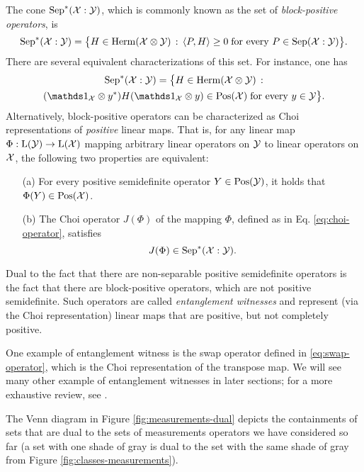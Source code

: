 The cone $\mathrm{Sep}^{\ast}(\mathcal{X} : \mathcal{Y})$, which is commonly known as the set of 
\emph{block-positive operators}, is
\begin{equation}
  \mathrm{Sep}^{\ast}(\mathcal{X}:\mathcal{Y}) = \bigl\{
  H\in\mathrm{Herm}(\mathcal{X}\otimes\mathcal{Y})\,:\,
  \langle P , H\rangle \geq 0 \;\text{for every $P \in \mathrm{Sep}(\mathcal{X}:\mathcal{Y})$}\bigr\}.
\end{equation}
There are several equivalent characterizations of this set.
For instance, one has
\begin{multline}
  \BPos(\X:\Y) = \bigl\{
  H\in\Herm(\X\otimes\Y)\,:\\
  (\I_{\X} \otimes y^{\ast}) H (\I_{\X} \otimes y)\in\Pos(\X)
  \;\text{for every $y\in\Y$}\bigr\}.
\end{multline}
Alternatively, block-positive operators can be characterized as Choi 
representations of \emph{positive} linear maps.
That is, for any linear map $\Phi:\mathrm{L}(\mathcal{Y})\rightarrow\mathrm{L}(\mathcal{X})$
mapping arbitrary linear operators on $\mathcal{Y}$ to linear operators on $\mathcal{X}$, the
following two properties are equivalent:
\begin{itemize}
\item[(a)] For every positive semidefinite operator $Y \in \mathrm{Pos}(\mathcal{Y})$, it 
holds that $\Phi(Y) \in \mathrm{Pos}(\mathcal{X})$. 
\item[(b)] The Choi operator $J(\Phi)$ of the mapping $\Phi$,
defined as in Eq. \eqref{eq:choi-operator}, satisfies 
\begin{equation}
  J(\Phi) \in \mathrm{Sep}^{\ast}(\mathcal{X}:\mathcal{Y}).
\end{equation}
\end{itemize}

Dual to the fact that there are non-separable positive semidefinite operators 
is the fact that there are block-positive operators, which are not 
positive semidefinite. Such operators are called \emph{entanglement witnesses} 
and represent (via the Choi representation) linear maps that are positive, 
but not completely positive.

One example of entanglement witness is the swap operator defined in 
\eqref{eq:swap-operator}, which is the Choi representation
of the transpose map.
We will see many other example of entanglement witnesses in later sections;
for a more exhaustive review, see \cite{Chruscinski2014}.

The Venn diagram in Figure \ref{fig:measurements-dual} depicts the containments
of sets that are dual to the sets of measurements operators we have considered so far  
(a set with one shade of gray is dual to the set with the same shade of gray from
Figure \ref{fig:classes-measurements}).

